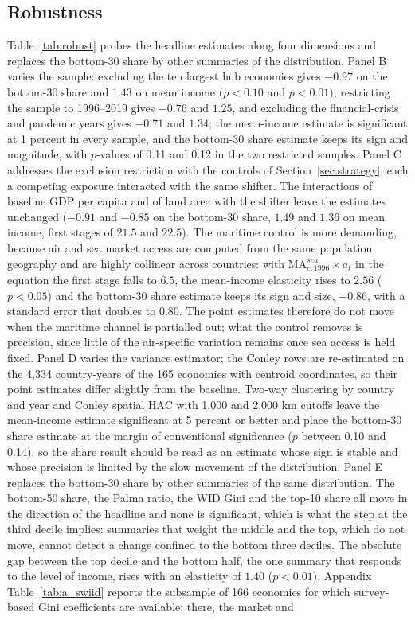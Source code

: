 \subsection{Robustness}
\label{sec:robust}
Table~\ref{tab:robust} probes the headline estimates along four dimensions and replaces the bottom-30 share by other summaries of the distribution. Panel B varies the sample: excluding the ten largest hub economies gives $-0.97$ on the bottom-30 share and $1.43$ on mean income ($p<0.10$ and $p<0.01$), restricting the sample to 1996--2019 gives $-0.76$ and $1.25$, and excluding the financial-crisis and pandemic years gives $-0.71$ and $1.34$; the mean-income estimate is significant at 1 percent in every sample, and the bottom-30 share estimate keeps its sign and magnitude, with $p$-values of 0.11 and 0.12 in the two restricted samples. Panel C addresses the exclusion restriction with the controls of Section~\ref{sec:strategy}, each a competing exposure interacted with the same shifter. The interactions of baseline GDP per capita and of land area with the shifter leave the estimates unchanged ($-0.91$ and $-0.85$ on the bottom-30 share, $1.49$ and $1.36$ on mean income, first stages of $21.5$ and $22.5$). The maritime control is more demanding, because air and sea market access are computed from the same population geography and are highly collinear across countries: with $\mathrm{MA}^{sea}_{c,1996}\times a_t$ in the equation the first stage falls to $6.5$, the mean-income elasticity rises to $2.56$ ($p<0.05$) and the bottom-30 share estimate keeps its sign and size, $-0.86$, with a standard error that doubles to $0.80$. The point estimates therefore do not move when the maritime channel is partialled out; what the control removes is precision, since little of the air-specific variation remains once sea access is held fixed. Panel D varies the variance estimator; the Conley rows are re-estimated on the 4{,}334 country-years of the 165 economies with centroid coordinates, so their point estimates differ slightly from the baseline. Two-way clustering by country and year and Conley spatial HAC with 1{,}000 and 2{,}000 km cutoffs \citep{Conley_1999} leave the mean-income estimate significant at 5 percent or better and place the bottom-30 share estimate at the margin of conventional significance ($p$ between 0.10 and 0.14), so the share result should be read as an estimate whose sign is stable and whose precision is limited by the slow movement of the distribution. Panel E replaces the bottom-30 share by other summaries of the same distribution. The bottom-50 share, the Palma ratio, the WID Gini and the top-10 share all move in the direction of the headline and none is significant, which is what the step at the third decile implies: summaries that weight the middle and the top, which do not move, cannot detect a change confined to the bottom three deciles. The absolute gap between the top decile and the bottom half, the one summary that responds to the level of income, rises with an elasticity of $1.40$ ($p<0.01$). Appendix Table~\ref{tab:a_swiid} reports the subsample of 166 economies for which survey-based Gini coefficients are available: there, the market and 